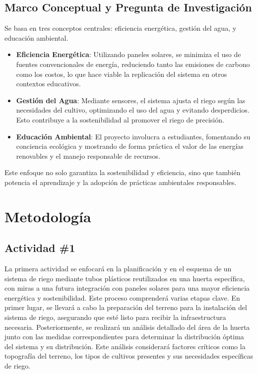 \documentclass[12pt]{article}
\begin{document}
\subsection{Marco Conceptual y Pregunta de Investigación}
Se basa en tres conceptos centrales: eficiencia energética, gestión del agua, y educación ambiental.
\begin{itemize}
      \item \textbf{Eficiencia Energética}: Utilizando paneles solares, se minimiza el uso de fuentes convencionales de energía, reduciendo tanto las emisiones de carbono como los costos, lo que hace viable la replicación del sistema en otros contextos educativos.
      \item \textbf{Gestión del Agua}: Mediante sensores, el sistema ajusta el riego según las necesidades del cultivo, optimizando el uso del agua y evitando desperdicios. Esto contribuye a la sostenibilidad al promover el riego de precisión.
      \item \textbf{Educación Ambiental}: El proyecto involucra a estudiantes, fomentando su conciencia ecológica y mostrando de forma práctica el valor de las energías renovables y el manejo responsable de recursos.
\end{itemize}

Este enfoque no solo garantiza la sostenibilidad y eficiencia, sino que también potencia el aprendizaje y la adopción de prácticas ambientales responsables.
\newpage
\section{Metodología}
\subsection{Actividad \#1}
La primera actividad se enfocará en la planificación y en el esquema de un sistema de riego mediante tubos plásticos reutilizados en una huerta específica, con miras a una futura integración con paneles solares para una mayor eficiencia energética y sostenibilidad. Este proceso comprenderá varias etapas clave. En primer lugar, se llevará a cabo la preparación del terreno para la instalación del sistema de riego, asegurando que esté listo para recibir la infraestructura necesaria. Posteriormente, se realizará un análisis detallado del área de la huerta junto con las medidas correspondientes para determinar la distribución óptima del sistema y su distribución. Este análisis considerará factores críticos como la topografía del terreno, los tipos de cultivos presentes y sus necesidades específicas de riego.
\end{document}
